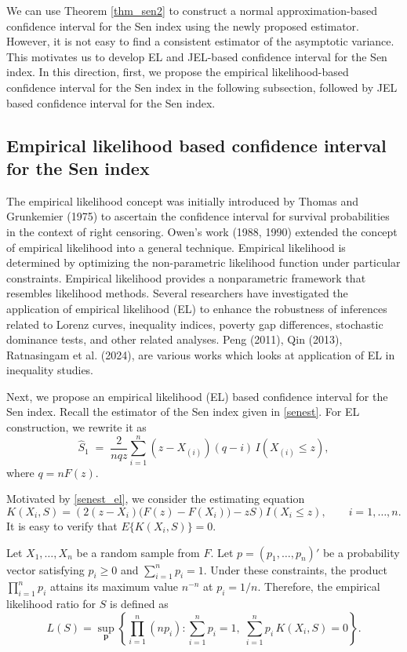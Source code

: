 \documentclass[11pt]{article}
\begin{document}
 We can use Theorem \ref{thm_sen2} to construct a normal approximation-based confidence interval for the Sen index using the newly proposed estimator. However, it is not easy to find a consistent estimator of the asymptotic variance.  This motivates us to develop EL and  JEL-based confidence interval for the Sen index. In this direction, first, we propose the empirical likelihood-based confidence interval for the Sen index in the following subsection, followed by JEL based confidence interval for the Sen index.
 \subsection{Empirical likelihood based confidence interval for the Sen index}
The empirical likelihood concept was initially introduced by Thomas and Grunkemier (1975) to ascertain the confidence interval for survival probabilities in the context of right censoring.   Owen's work (1988, 1990) extended the concept of empirical likelihood into a general technique. Empirical likelihood is determined by optimizing the non-parametric likelihood function under particular constraints.   Empirical likelihood provides a nonparametric framework that resembles likelihood methods.  Several researchers have investigated the application of empirical likelihood (EL) to enhance the robustness of inferences related to Lorenz curves, inequality indices, poverty gap differences, stochastic dominance tests, and other related analyses. Peng (2011), Qin (2013), Ratnasingam et al. (2024),  are various works which looks at application of EL in inequality studies.



Next, we propose an empirical likelihood (EL) based confidence interval for the Sen index.
Recall the estimator of the Sen index given in \eqref{senest}. For EL construction, we rewrite it as
\begin{equation}
\label{senest_el}
\widehat{S}_1 \;=\; \frac{2}{nqz} \sum_{i=1}^{n} (z - X_{(i)})(q-i)\, I\!\left(X_{(i)} \le z\right),
\end{equation}
where $q=n F(z)$.

Motivated by \eqref{senest_el}, we consider the estimating equation
\begin{equation}
\label{K_def}
K(X_i,S)
=
\left( 2(z - X_i)\big(F(z)-F(X_i)\big) - zS \right)
I(X_i \le z), \qquad i=1,\dots,n .
\end{equation}
It is easy to verify that $E\{K(X_i,S)\}=0$.

Let $X_1,\dots,X_n$ be a random sample from $F$. Let
$p=(p_1,\dots,p_n)'$ be a probability vector satisfying $p_i\ge 0$ and
$\sum_{i=1}^{n}p_i =1$.
Under these constraints, the product $\prod_{i=1}^{n} p_i$ attains its maximum value $n^{-n}$
at $p_i = 1/n$.
Therefore, the empirical likelihood ratio for $S$ is defined as
\begin{equation*}
L(S)
=
\sup_{\mathbf p}
\left\{
\prod_{i=1}^n (np_i)
:
\sum_{i=1}^n p_i = 1,\;
\sum_{i=1}^n p_i\, K(X_i,S)=0
\right\}.
\end{equation*}
\end{document}
